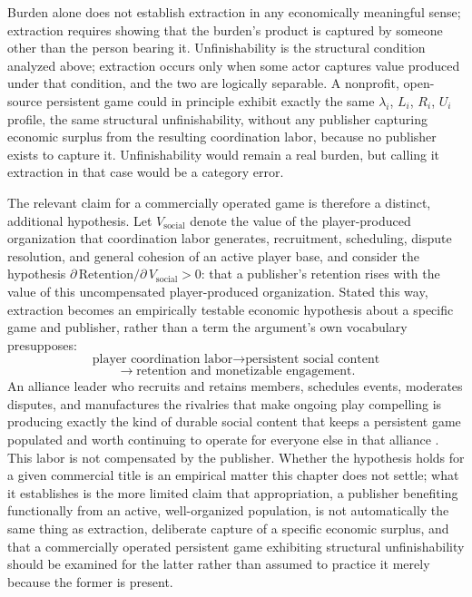 Burden alone does not establish extraction in any economically meaningful sense; extraction requires showing that the burden's product is captured by someone other than the person bearing it. Unfinishability is the structural condition analyzed above; extraction occurs only when some actor captures value produced under that condition, and the two are logically separable. A nonprofit, open-source persistent game could in principle exhibit exactly the same $\lambda_i$, $L_i$, $R_i$, $U_i$ profile, the same structural unfinishability, without any publisher capturing economic surplus from the resulting coordination labor, because no publisher exists to capture it. Unfinishability would remain a real burden, but calling it extraction in that case would be a category error.

The relevant claim for a commercially operated game is therefore a distinct, additional hypothesis. Let $V_{\mathrm{social}}$ denote the value of the player-produced organization that coordination labor generates, recruitment, scheduling, dispute resolution, and general cohesion of an active player base, and consider the hypothesis $\partial\,\mathrm{Retention}/\partial\,V_{\mathrm{social}} > 0$: that a publisher's retention rises with the value of this uncompensated player-produced organization. Stated this way, extraction becomes an empirically testable economic hypothesis about a specific game and publisher, rather than a term the argument's own vocabulary presupposes:
\[
\text{player coordination labor} \longrightarrow \text{persistent social content}
\]
\[
\longrightarrow \text{retention and monetizable engagement}.
\]
An alliance leader who recruits and retains members, schedules events, moderates disputes, and manufactures the rivalries that make ongoing play compelling is producing exactly the kind of durable social content that keeps a persistent game populated and worth continuing to operate for everyone else in that alliance \cite{levine2008,nardi2010,yee2006}. This labor is not compensated by the publisher. Whether the hypothesis holds for a given commercial title is an empirical matter this chapter does not settle; what it establishes is the more limited claim that appropriation, a publisher benefiting functionally from an active, well-organized population, is not automatically the same thing as extraction, deliberate capture of a specific economic surplus, and that a commercially operated persistent game exhibiting structural unfinishability should be examined for the latter rather than assumed to practice it merely because the former is present.

